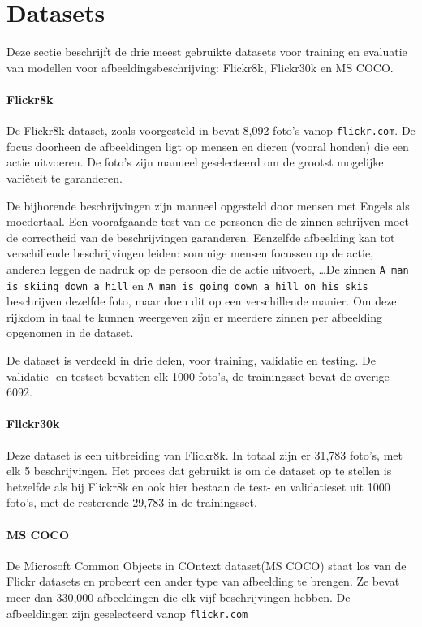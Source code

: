 \section{Datasets}
\label{sec:Datasets}
Deze sectie beschrijft de drie meest gebruikte datasets voor training en evaluatie van modellen voor afbeeldingsbeschrijving: Flickr8k, Flickr30k en MS COCO.

\paragraph{Flickr8k}
\label{par:Flickr8k}
De Flickr8k dataset, zoals voorgesteld in  bevat 8,092 foto's vanop \texttt{flickr.com}. De focus doorheen de afbeeldingen ligt op mensen en dieren (vooral honden) die een actie uitvoeren. De foto's zijn manueel geselecteerd om de grootst mogelijke vari\"eteit te garanderen.

De bijhorende beschrijvingen zijn manueel opgesteld door mensen met Engels als moedertaal. Een voorafgaande test van de personen die de zinnen schrijven moet de correctheid van de beschrijvingen garanderen. Eenzelfde afbeelding kan tot verschillende beschrijvingen leiden: sommige mensen focussen op de actie, anderen leggen de nadruk op de persoon die de actie uitvoert, \ldots De zinnen \texttt{A man is skiing down a hill} en \texttt{A man is going down a hill on his skis} beschrijven dezelfde foto, maar doen dit op een verschillende manier. Om deze rijkdom in taal te kunnen weergeven zijn er meerdere zinnen per afbeelding opgenomen in de dataset.

De dataset is verdeeld in drie delen, voor training, validatie en testing. De validatie- en testset bevatten elk 1000 foto's, de trainingsset bevat de overige 6092.


\paragraph{Flickr30k}
\label{par:Flickr30k}
Deze dataset  is een uitbreiding van Flickr8k. In totaal zijn er 31,783 foto's, met elk 5 beschrijvingen. Het proces dat gebruikt is om de dataset op te stellen is hetzelfde als bij Flickr8k  en ook hier bestaan de test- en validatieset uit 1000 foto's, met de resterende 29,783 in de trainingsset.


\paragraph{MS COCO}
\label{par:MS COCO}
De Microsoft Common Objects in COntext dataset(MS COCO)  staat los van de Flickr datasets en probeert een ander type van afbeelding te brengen. Ze bevat meer dan 330,000 afbeeldingen die elk vijf beschrijvingen hebben. De afbeeldingen zijn geselecteerd vanop \texttt{flickr.com}

